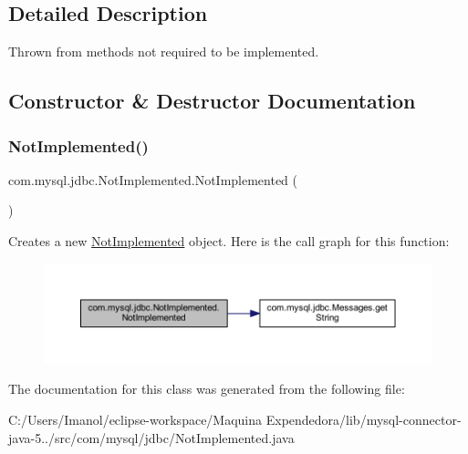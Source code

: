 \subsection{Detailed Description}
Thrown from methods not required to be implemented. 

\subsection{Constructor \& Destructor Documentation}
\mbox{\label{classcom_1_1mysql_1_1jdbc_1_1_not_implemented_ad75f857caad109fdfc333191d251ea15}} 
\subsubsection{\texorpdfstring{Not\+Implemented()}{NotImplemented()}}
{\footnotesize\ttfamily com.\+mysql.\+jdbc.\+Not\+Implemented.\+Not\+Implemented (\begin{DoxyParamCaption}{ }\end{DoxyParamCaption})}

Creates a new \mbox{\hyperlink{classcom_1_1mysql_1_1jdbc_1_1_not_implemented}{Not\+Implemented}} object. Here is the call graph for this function\+:
\nopagebreak
\begin{figure}[H]
\begin{center}
\leavevmode
\includegraphics[width=350pt]{classcom_1_1mysql_1_1jdbc_1_1_not_implemented_ad75f857caad109fdfc333191d251ea15_cgraph}
\end{center}
\end{figure}


The documentation for this class was generated from the following file\+:\begin{DoxyCompactItemize}
\item 
C\+:/\+Users/\+Imanol/eclipse-\/workspace/\+Maquina Expendedora/lib/mysql-\/connector-\/java-\/5../src/com/mysql/jdbc/Not\+Implemented.\+java\end{DoxyCompactItemize}
